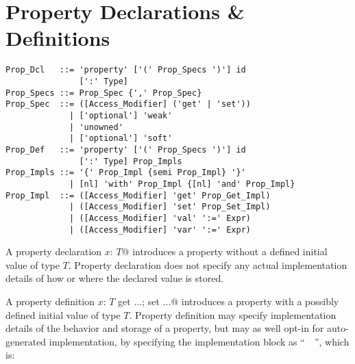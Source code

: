 \section{Property Declarations \& Definitions}
\label{sec:property-dec-dfn}

\grammar\begin{lstlisting}
Prop_Dcl   ::= 'property' ['(' Prop_Specs ')'] id 
               [':' Type]
Prop_Specs ::= Prop_Spec {',' Prop_Spec}
Prop_Spec  ::= ([Access_Modifier] ('get' | 'set')) 
             | ['optional'] 'weak'
             | 'unowned'
             | ['optional'] 'soft'
Prop_Def   ::= 'property' ['(' Prop_Specs ')'] id 
               [':' Type] Prop_Impls
Prop_Impls ::= '{' Prop_Impl {semi Prop_Impl} '}'
             | [nl] 'with' Prop_Impl {[nl] 'and' Prop_Impl}
Prop_Impl  ::= ([Access_Modifier] 'get' Prop_Get_Impl)
             | ([Access_Modifier] 'set' Prop_Set_Impl)
             | ([Access_Modifier] 'val' ':=' Expr)
             | ([Access_Modifier] 'var' ':=' Expr)
\end{lstlisting}

A property declaration \lstinline@property $x$: $T$@ introduces a property without a defined initial value of type $T$. Property declaration does not specify any actual implementation details of how or where the declared value is stored.

A property definition \lstinline@property $x$: $T$ {get $\ldots$; set $\ldots$}@ introduces a property with a possibly defined initial value of type $T$. Property definition may specify implementation details of the behavior and storage of a property, but may as well opt-in for auto-generated implementation, by specifying the implementation block as ``~\code{_}~'', which is: 

